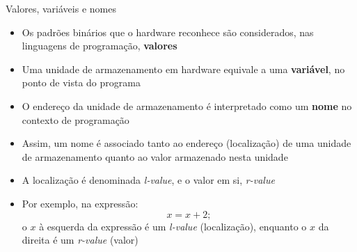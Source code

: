 \begin{frame}[fragile]{Valores, variáveis e nomes}

    \begin{itemize}
        \item Os padrões binários que o hardware reconhece são considerados, nas linguagens de 
            programação, \textbf{valores}

        \item Uma unidade de armazenamento em hardware equivale a uma \textbf{variável}, no ponto 
            de vista do programa

        \item O endereço da unidade de armazenamento é interpretado como um \textbf{nome} no 
            contexto de programação

        \item Assim, um nome é associado tanto ao endereço (localização) de uma unidade de 
            armazenamento quanto ao valor armazenado nesta unidade

        \item A localização é denominada \textit{l-value}, e o valor em si, \textit{r-value}

        \item Por exemplo, na expressão:
        \[
            x = x + 2;
        \]
        o $x$ à esquerda da expressão é um \textit{l-value} (localização), enquanto o $x$ da 
        direita é um \textit{r-value} (valor)

    \end{itemize}

\end{frame}
